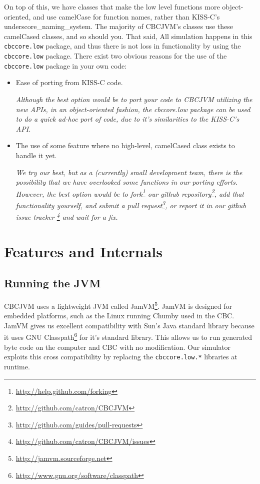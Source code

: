 \documentclass[10pt,letterpaper]{article}
\newcommand{\urlfootnote}[1]{\footnote{\url{#1}}}
\begin{document}
On top of this, we have classes that make the low level functions more object-oriented, and use camelCase for function names, rather than KISS-C's underscore{\_}naming{\_}system. The majority of CBCJVM's classes use these camelCased classes, and so should you. That said, All simulation happens in this \texttt{cbccore.low} package, and thus there is not loss in functionality by using the \texttt{cbccore.low} package. There exist two obvious reasons for the use of the \texttt{cbccore.low} package in your own code:
\begin{itemize}
\item Ease of porting from KISS-C code.

\textit{Although the best option would be to port your code to CBCJVM utilizing the new APIs, in an object-oriented fashion, the \textit{cbccore.low} package can be used to do a quick ad-hoc port of code, due to it's similarities to the KISS-C's API.}

\item The use of some feature where no high-level, camelCased class exists to handle it yet.

\textit{We try our best, but as a (currently) small development team, there is the possibility that we have overlooked some functions in our porting efforts. However, the best option would be to fork\urlfootnote{http://help.github.com/forking} our github repository\urlfootnote{http://github.com/catron/CBCJVM}, add that functionality yourself, and submit a pull request\urlfootnote{http://github.com/guides/pull-requests}, or report it in our github issue tracker \urlfootnote{http://github.com/catron/CBCJVM/issues} and wait for a fix.}
\end{itemize}



\pagebreak
\section{Features and Internals}

\subsection{Running the JVM}

CBCJVM uses a lightweight JVM called JamVM\urlfootnote{http://jamvm.sourceforge.net}. JamVM is designed for embedded platforms, such as the Linux running Chumby used in the CBC. JamVM gives us excellent compatibility with Sun's Java standard library because it uses GNU Classpath\urlfootnote{http://www.gnu.org/software/classpath} for it's standard library. This allows us to run generated byte code on the computer and CBC with no modification. Our simulator exploits this cross compatibility by replacing the \texttt{cbccore.low.*} libraries at runtime.
\end{document}
